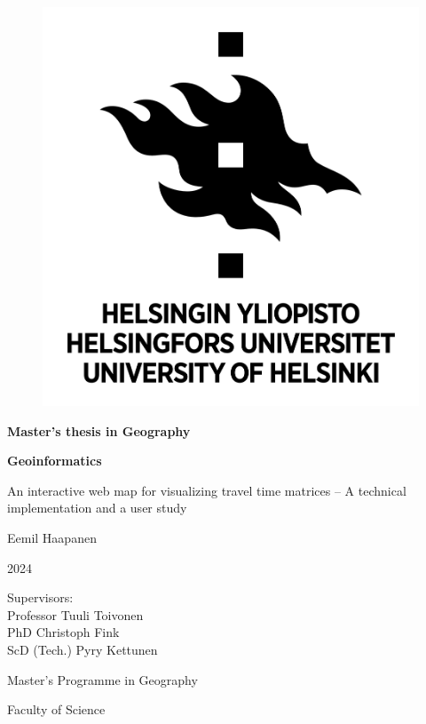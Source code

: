 \begin{center}{
    \begin{figure}[H]
        \centering
        \includegraphics[scale=0.4]{visual/other/helsinki_uni_logo.jpg}
    \end{figure}

    \bigskip
    \bigskip
    \bigskip
    \textbf{Master's thesis in Geography} \par
    \textbf{Geoinformatics} \par

    \bigskip
    \bigskip
    An interactive web map for visualizing travel time matrices -- A technical implementation and a user study

    \bigskip
    \bigskip
    Eemil Haapanen

    2024

    \vfill

    Supervisors: \\
    Professor Tuuli Toivonen \\
    PhD Christoph Fink \\
    ScD (Tech.) Pyry Kettunen \par
    \bigskip
    \bigskip
    \bigskip
    Master's Programme in Geography \par
    Faculty of Science \par
}
\end{center}
